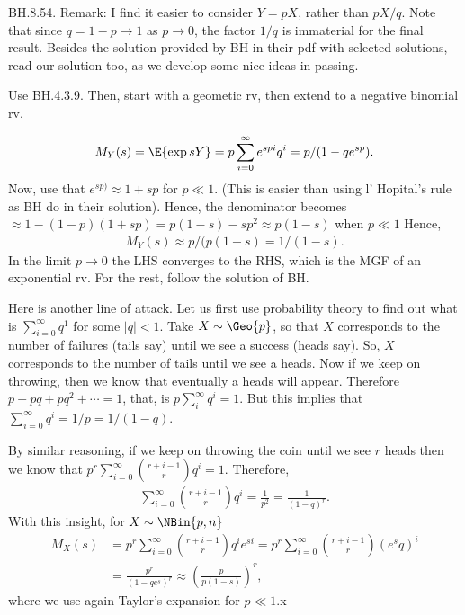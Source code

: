 
\setcounter{theorem}{53}
\begin{exercise} BH.8.54. Remark: I find it easier to consider $Y=pX$, rather than $pX/q$. Note that since $q=1-p\to 1$ as $p\to 0$, the factor $1/q$ is immaterial for the final result.
Besides the solution provided by BH in their pdf with selected solutions, read our solution too, as we develop some nice ideas in passing.

\begin{hint}
Use BH.4.3.9. Then, start with a geometic rv, then extend to a negative binomial rv.
\end{hint}
\begin{solution}
\begin{align*}
M_{Y}(s) =\E{\exp{s Y}} = p \sum_{i=0}^{\infty} e^{s p i} q^{i} = p/(1-qe^{sp}).
\end{align*}
Now, use that $e^{s p)} \approx 1 + s p$ for $p\ll 1$. (This is easier than using l' Hopital's rule as BH do in their solution). Hence, the denominator becomes $\approx 1-(1-p)(1+sp) = p(1-s) - sp^{2} \approx p(1-s)$ when $p\ll 1$ Hence,
\begin{align*}
M_{Y}(s) \approx p/(p(1-s) =  1/(1-s).
\end{align*}
In the limit $p\to 0$ the LHS converges to the RHS, which is the MGF of an exponential rv. For the rest, follow the solution of BH.

Here is another line of attack. Let us first use probability theory to find out what is $\sum_{i=0}^{\infty} q^{1}$ for some $|q|<1$. Take $X\sim\Geo{p}$, so that $X$ corresponds to the number of failures (tails say) until we see a success (heads say). So, $X$ corresponds to the number of tails until we see a heads. Now if we keep on throwing, then we know that eventually a heads will appear. Therefore $p + pq +pq^2 + \cdots = 1$, that, is $p\sum_i^{\infty} q^{i}=1$. But this implies that $\sum_{i=0}^{\infty}q^i = 1/ p = 1/(1-q)$.

By similar reasoning, if we keep on throwing the coin until we see $r$ heads then we know that $p^r \sum_{i=0}^{\infty} {r+i-1 \choose r} q^{i} = 1$.  Therefore,
\begin{align*}
\sum_{i=0}^{\infty} {r+i-1 \choose r} q^{i} =  \frac{1}{p^{2}}= \frac{1}{(1-q)^{r}}.
\end{align*}
With this insight, for $X\sim\NBin{p,n}$
\begin{align*}
  M_X(s) &= p^r \sum_{i=0}^{\infty} {r+i-1 \choose r} q^{i} e^{si}
 = p^r \sum_{i=0}^{\infty} {r+i-1 \choose r} (e^{s}q)^{i} \\
  &= \frac{p^r}{(1-qe^{s})^{r}} \approx \left(\frac{p}{p(1-s)}\right)^{r},
\end{align*}
where we use again Taylor's expansion for $p\ll 1$.x
\end{solution}
\end{exercise}

